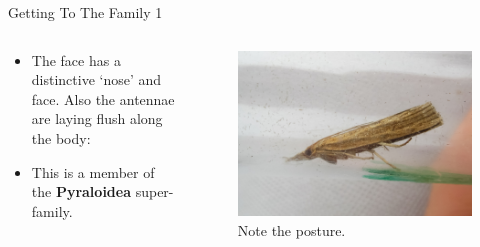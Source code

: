 \documentclass[
  ignorenonframetext,
]{beamer}
\providecommand{\tightlist}{%
  \setlength{\itemsep}{0pt}\setlength{\parskip}{0pt}}
\begin{document}
\begin{frame}{Getting To The Family 1}
\protect\hypertarget{getting-to-the-family-1}{}
\begin{columns}[T]
\begin{column}{0.5\textwidth}
\begin{itemize}
\tightlist
\item
  The face has a distinctive `nose' and face. Also the antennae are
  laying flush along the body:
\item
  This is a member of the \textbf{Pyraloidea} super-family.
\end{itemize}
\end{column}

\begin{column}{0.5\textwidth}
\begin{figure}
\centering
\includegraphics{./images/Pcontaminella-PML-2021.jpg}
\caption{Note the posture.}
\end{figure}
\end{column}
\end{columns}
\end{frame}
\end{document}
